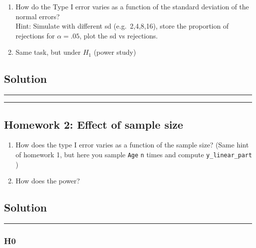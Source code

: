 \documentclass[]{article}
\begin{document}
\begin{enumerate}
\def\labelenumi{\arabic{enumi}.}
\item
  How do the Type I error varies as a function of the standard deviation
  of the normal errors?\\
  Hint: Simulate with different sd (e.g.~2,4,8,16), store the proportion
  of rejections for \(\alpha=.05\), plot the sd vs rejections.
\item
  Same task, but under \(H_1\) (power study)
\end{enumerate}

\hypertarget{solution}{%
\subsection{Solution}\label{solution}}

\begin{center}\rule{0.5\linewidth}{\linethickness}\end{center}

\begin{center}\rule{0.5\linewidth}{\linethickness}\end{center}

\hypertarget{homework-2-effect-of-sample-size}{%
\subsection{Homework 2: Effect of sample
size}\label{homework-2-effect-of-sample-size}}

\begin{enumerate}
\def\labelenumi{\arabic{enumi}.}
\item
  How does the type I error varies as a function of the sample size?
  (Same hint of homework 1, but here you sample \texttt{Age} \texttt{n}
  times and compute \texttt{y\_linear\_part} )
\item
  How does the power?
\end{enumerate}

\hypertarget{solution-1}{%
\subsection{Solution}\label{solution-1}}

\begin{center}\rule{0.5\linewidth}{\linethickness}\end{center}

\hypertarget{h0}{%
\subsubsection{H0}\label{h0}}
\end{document}
